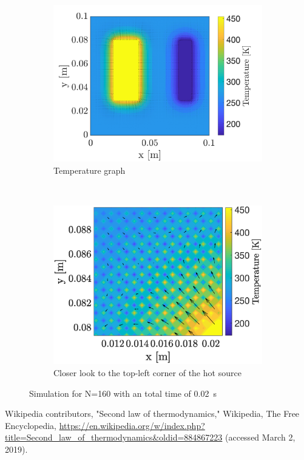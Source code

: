 \documentclass[a4paper,12pt,twoside]{article}
\begin{document}
\begin{figure}[h]
  \centering
  \begin{subfigure}[t]{0.45\textwidth}
    \centering
    \includegraphics[width=\textwidth]{graphs/f1_temp.png}
    \caption{Temperature graph}
    \label{fig:fac1-temp}
  \end{subfigure}
  ~
  \begin{subfigure}[t]{0.45\textwidth}
    \centering
    \includegraphics[width=\textwidth]{graphs/f1_temp_close.eps}
    \caption{Closer look to the top-left corner of the hot source}
    \label{fig:fac1-temp-close}
  \end{subfigure}
  \caption{Simulation for N=160 with an total time of \SI{0.02}{\s}}
  \label{fig:fac1}
\end{figure}

\begin{thebibliography}{99}
   Wikipedia contributors, "Second law of thermodynamics," Wikipedia, The Free Encyclopedia, \url{https://en.wikipedia.org/w/index.php?title=Second_law_of_thermodynamics&oldid=884867223} (accessed March 2, 2019).


\end{thebibliography}
\end{document}
